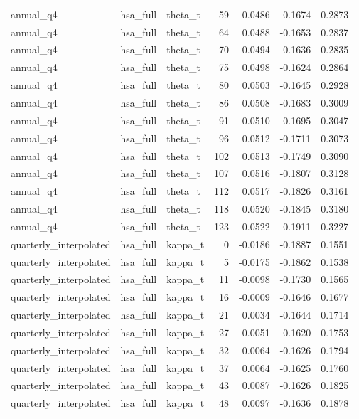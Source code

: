 \begin{tabular}{lllrrrr}
annual\_q4 & hsa\_full & theta\_t & 59 & 0.0486 & -0.1674 & 0.2873 \\
annual\_q4 & hsa\_full & theta\_t & 64 & 0.0488 & -0.1653 & 0.2837 \\
annual\_q4 & hsa\_full & theta\_t & 70 & 0.0494 & -0.1636 & 0.2835 \\
annual\_q4 & hsa\_full & theta\_t & 75 & 0.0498 & -0.1624 & 0.2864 \\
annual\_q4 & hsa\_full & theta\_t & 80 & 0.0503 & -0.1645 & 0.2928 \\
annual\_q4 & hsa\_full & theta\_t & 86 & 0.0508 & -0.1683 & 0.3009 \\
annual\_q4 & hsa\_full & theta\_t & 91 & 0.0510 & -0.1695 & 0.3047 \\
annual\_q4 & hsa\_full & theta\_t & 96 & 0.0512 & -0.1711 & 0.3073 \\
annual\_q4 & hsa\_full & theta\_t & 102 & 0.0513 & -0.1749 & 0.3090 \\
annual\_q4 & hsa\_full & theta\_t & 107 & 0.0516 & -0.1807 & 0.3128 \\
annual\_q4 & hsa\_full & theta\_t & 112 & 0.0517 & -0.1826 & 0.3161 \\
annual\_q4 & hsa\_full & theta\_t & 118 & 0.0520 & -0.1845 & 0.3180 \\
annual\_q4 & hsa\_full & theta\_t & 123 & 0.0522 & -0.1911 & 0.3227 \\
quarterly\_interpolated & hsa\_full & kappa\_t & 0 & -0.0186 & -0.1887 & 0.1551 \\
quarterly\_interpolated & hsa\_full & kappa\_t & 5 & -0.0175 & -0.1862 & 0.1538 \\
quarterly\_interpolated & hsa\_full & kappa\_t & 11 & -0.0098 & -0.1730 & 0.1565 \\
quarterly\_interpolated & hsa\_full & kappa\_t & 16 & -0.0009 & -0.1646 & 0.1677 \\
quarterly\_interpolated & hsa\_full & kappa\_t & 21 & 0.0034 & -0.1644 & 0.1714 \\
quarterly\_interpolated & hsa\_full & kappa\_t & 27 & 0.0051 & -0.1620 & 0.1753 \\
quarterly\_interpolated & hsa\_full & kappa\_t & 32 & 0.0064 & -0.1626 & 0.1794 \\
quarterly\_interpolated & hsa\_full & kappa\_t & 37 & 0.0064 & -0.1625 & 0.1760 \\
quarterly\_interpolated & hsa\_full & kappa\_t & 43 & 0.0087 & -0.1626 & 0.1825 \\
quarterly\_interpolated & hsa\_full & kappa\_t & 48 & 0.0097 & -0.1636 & 0.1878 \\

\end{tabular}
